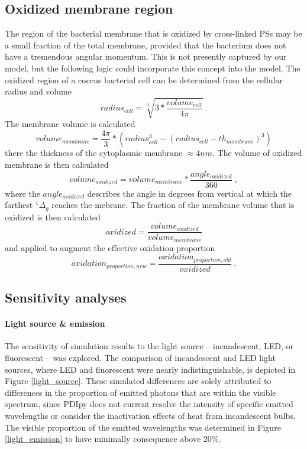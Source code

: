 \subsection{Oxidized membrane region}
The region of the bacterial membrane that is oxidized by cross-linked PSs may be a small fraction of the total membrane, provided that the bacterium does not have a tremendous angular momentum. This is not presently captured by our model, but the following logic could incorporate this concept into the model. The oxidized region of a coccus bacterial cell can be determined from the cellular radius and volume
\begin{equation}
    radius_{cell} = \sqrt[3]{3*\frac{volume_{cell}}{4\pi}}~.
\end{equation}
The membrane volume is calculated
\begin{equation}
    volume_{membrane} = \frac{4\pi}{3}*(radius_{cell}^3 - (radius_{cell}-th_{membrane})^3)
\end{equation}
there the thickness of the cytoplasmic membrane $\approx 4 nm$. The volume of oxidized membrane is then calculated
\begin{equation}
    volume_{oxidized} = volume_{membrane}*\frac{angle_{oxidized}}{360}~,    
\end{equation}
where the $angle_{oxidized}$ describes the angle in degrees from vertical at which the farthest $^1\Delta_g$ reaches the mebrane. The fraction of the membrane volume that is oxidized is then calculated 
\begin{equation}
    oxidized = \frac{volume_{oxidized}}{volume_{membrane}} 
\end{equation}
and applied to augment the effective oxidation proportion
\begin{equation}
    oxidation_{proportion,new} = \frac{oxidation_{proportion,old}}{oxidized}~.
\end{equation}

\subsection{Sensitivity analyses}

\paragraph{Light source \& emission}
The sensitivity of simulation results to the light source -- incandescent, LED, or fluorescent -- was explored. The comparison of incandescent and LED light sources, where LED and fluorescent were nearly indistinguishable, is depicted in Figure \ref{light_source}. These simulated differences are solely attributed to differences in the proportion of emitted photons that are within the visible spectrum, since PDIpy does not current resolve the intensity of specific emitted wavelengths or consider the inactivation effects of heat from incandescent bulbs. The visible proportion of the emitted wavelengths was determined in Figure \ref{light_emission} to have minimally consequence above 20\%.

